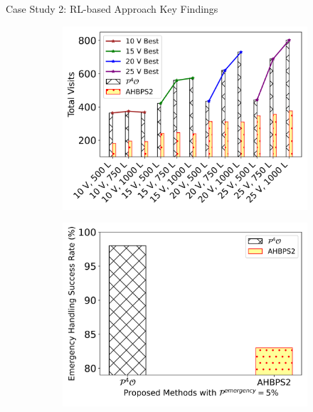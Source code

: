 \documentclass{beamer}
\begin{document}
\begin{frame}{Case Study 2: RL-based Approach Key Findings}
    \begin{figure}[t]
    \centering
    \begin{subfigure}{0.48\textwidth}
        \centering
        \includegraphics[width=\textwidth]{figs/large_acc_corrected (2).png}
        \caption{}
    \end{subfigure}
    \hfill
    \begin{subfigure}{0.48\textwidth}
        \centering
        \includegraphics[width=\textwidth]{figs/emergency_handling.png}
        \caption{}
    \end{subfigure}
\end{figure}
\end{frame}
\end{document}
